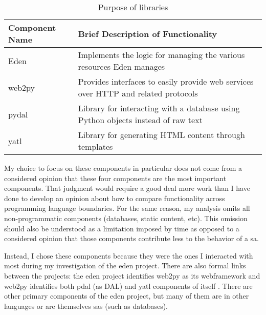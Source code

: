\documentclass[a4paper,man,natbib,floatsintext]{apa6}
\begin{document}
  \begin{table}[ht]
  \caption{Purpose of libraries}
  \label{tab:table-1}
  \begin{tabular}{|l|p{}|}
  \hline
  Component Name & Brief Description of Functionality                                                 \\ \hline
  Eden           & Implements the logic for managing the various resources Eden manages               \\ \hline
  web2py         & Provides interfaces to easily provide web services over HTTP and related protocols \\ \hline
  pydal          & Library for interacting with a database using Python objects instead of raw text   \\ \hline
  yatl           & Library for generating HTML content through templates                              \\ \hline
  \end{tabular}
\end{table}
  
  My choice to focus on these components in particular does not come from a considered opinion that these four components are the most important components. That judgment would require a good deal more work than I have done to develop an opinion about how to compare functionality across programming language boundaries. For the same reason, my analysis omits all non-programmatic components (databases, static content, etc). This omission should also be understood as a limitation imposed by time as opposed to a considered opinion that those components contribute less to the behavior of a \gls{sa}. 

  Instead, I chose these components because they were the ones I interacted with most during my investigation of the \acrshort{eden} project. There are also formal links between the projects: the \acrshort{eden} project identifies web2py as its \gls{webframework} and web2py identifies both pdal (as DAL) and yatl components of itself \citep{Di_Pierro2020-wn,Sahana_Foundation_undated-ww}. There are other primary components of the \acrshort{eden} project, but many of them are in other languages or are themselves \glspl{sa} (such as databases).
\end{document}
